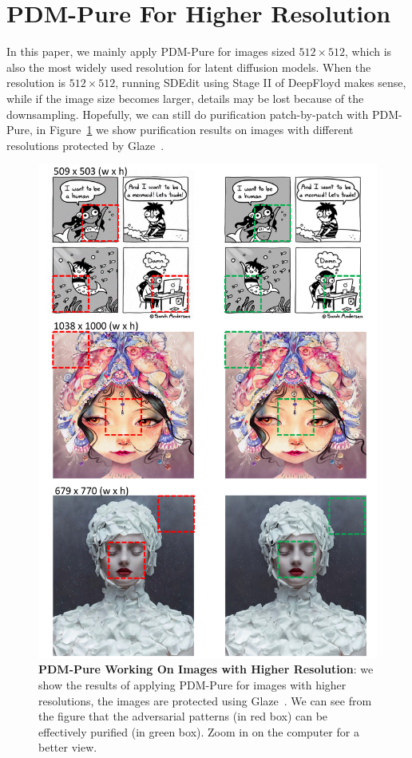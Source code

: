 \section{PDM-Pure For Higher Resolution}\label{supp:section:pdm_pure_for_higher_resolution}

In this paper, we mainly apply PDM-Pure for images sized $512\times 512$, which is also the most widely used resolution for latent diffusion models. When the resolution is $512\times 512$, running SDEdit using Stage II of DeepFloyd makes sense, while if the image size becomes larger, details may be lost because of the downsampling. Hopefully, we can still do purification patch-by-patch with PDM-Pure, in Figure~\ref{supp:section:pdm_pure_for_higher_resolution} we show purification results on images with different resolutions protected by Glaze~\cite{glaze}.


\begin{figure}
    \centering
    \includegraphics[width=.99\textwidth]{images/supp/larger_image_pdm_pure.pdf}
    \caption{\textbf{PDM-Pure Working On Images with Higher Resolution}: we show the results of applying PDM-Pure for images with higher resolutions, the images are protected using Glaze~\cite{glaze}. We can see from the figure that the adversarial patterns (in red box) can be effectively purified (in green box). Zoom in on the computer for a better view.}
    \label{fig:supp:pdm_pure_larger_image}
\end{figure}

